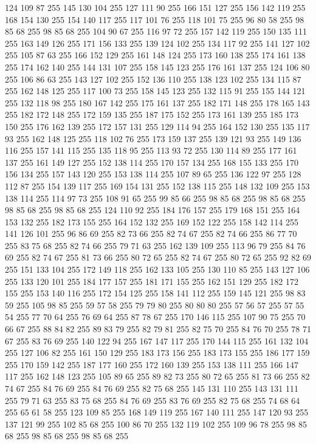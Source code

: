 124 109 87 255 145 130 104 255 127 111 90 255 166 151 127 255 156 142 119 255 168 154 130 255 154 140 117 255 117 101 76 255 118 101 75 255 96 80 58 255 98 85 68 255 98 85 68 255 104 90 67 255 116 97 72 255 157 142 119 255 150 135 111 255 163 149 126 255 171 156 133 255 139 124 102 255 134 117 92 255 141 127 102 255 105 87 63 255 166 152 129 255 161 148 124 255 173 160 138 255 174 161 138 255 174 162 140 255 144 131 107 255 158 145 123 255 176 161 137 255 124 106 80 255 106 86 63 255 143 127 102 255 152 136 110 255 138 123 102 255 134 115 87 255 162 148 125 255 117 100 73 255 158 145 123 255 132 115 91 255 155 144 121 255 132 118 98 255 180 167 142 255 175 161 137 255 182 171 148 255 178 165 143 255 182 172 148 255 172 159 135 255 187 175 152 255 173 161 139 255 185 173 150 255 176 162 139 255 172 157 131 255 129 114 94 255 164 152 130 255 135 117 93 255 162 148 125 255 118 102 76 255 173 159 137 255 139 121 93 255 149 136 116 255 157 141 115 255 135 118 95 255 113 93 72 255
130 114 89 255 177 161 137 255 161 149 127 255 152 138 114 255 170 157 134 255 168 155 133 255 170 156 134 255 157 143 120 255 153 138 114 255 107 89 65 255 136 122 97 255 128 112 87 255 154 139 117 255 169 154 131 255 152 138 115 255 148 132 109 255 153 138 114 255 114 97 73 255 108 91 65 255 99 85 66 255 98 85 68 255 98 85 68 255 98 85 68 255 98 85 68 255 124 110 92 255 184 176 157 255 179 168 151 255 164 153 132 255 182 173 155 255 164 152 132 255 169 152 122 255 158 142 114 255 141 126 101 255 96 86 69 255 82 73 66 255 82 74 67 255 82 74 66 255 86 77 70 255 83 75 68 255 82 74 66 255 79 71 63 255 162 139 109 255 113 96 79 255 84 76 69 255 82 74 67 255 81 73 66 255 80 72 65 255 82 74 67 255 80 72 65 255 92 82 69 255 151 133 104 255 172 149 118 255 162 133 105 255 130 110 85 255 143 127 106 255 133 120 101 255 184 177 157 255 181 171 155 255 162 151 129 255 182 172 155 255 153 140 116 255 172 154 125 255 158 141 112 255 159 145 121 255
98 83 59 255 105 98 85 255 59 57 58 255 79 79 80 255 80 80 80 255 57 56 57 255 57 55 54 255 77 70 64 255 76 69 64 255 87 78 67 255 170 146 115 255 107 90 75 255 70 66 67 255 88 84 82 255 89 83 79 255 82 79 81 255 82 75 70 255 84 76 70 255 78 71 67 255 83 76 69 255 140 122 94 255 167 147 117 255 170 144 115 255 161 132 104 255 127 106 82 255 161 150 129 255 183 173 156 255 183 173 155 255 186 177 159 255 170 159 142 255 187 177 160 255 172 160 139 255 153 138 111 255 166 147 117 255 162 148 123 255 105 89 65 255 89 82 73 255 80 72 65 255 81 73 66 255 82 74 67 255 84 76 69 255 84 76 69 255 82 75 68 255 145 131 110 255 143 131 111 255 79 71 63 255 83 75 68 255 84 76 69 255 83 76 69 255 82 75 68 255 74 68 64 255 65 61 58 255 123 109 85 255 168 149 119 255 167 140 111 255 147 120 93 255 137 121 99 255 102 85 68 255 100 86 70 255 132 119 102 255 109 96 78 255 98 85 68 255 98 85 68 255 98 85 68 255
